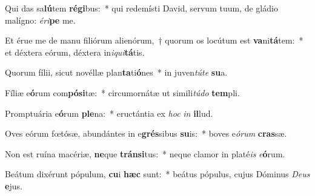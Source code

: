 \item Qui das sa\textbf{lú}tem \textbf{ré}\textbf{gi}bus:~* qui redemísti David, servum tuum, de gládio malígno: \textit{é}\textit{ri}\textbf{pe} me.
\item Et érue me de manu filiórum alienórum,~† quorum os locútum est \textbf{va}ni\textbf{tá}tem:~* et déxtera eórum, déxtera in\textit{i}\textit{qui}\textbf{tá}tis.
\item Quorum fílii, sicut novéllæ plan\textbf{ta}ti\textbf{ó}nes~* in juven\textit{tú}\textit{te} \textbf{su}a.
\item Fíliæ e\textbf{ó}rum com\textbf{pó}\textbf{si}tæ:~* circumornátæ ut simili\textit{tú}\textit{do} \textbf{tem}pli.
\item Promptuária e\textbf{ó}rum \textbf{ple}na:~* eructántia ex \textit{hoc} \textit{in} \textbf{il}lud.
\item Oves eórum fœtósæ, abundántes in e\textbf{grés}sibus \textbf{su}is:~* boves e\textit{ó}\textit{rum} \textbf{cras}sæ.
\item Non est ruína macériæ, \textbf{ne}que \textbf{tráns}\textbf{i}tus:~* neque clamor in platé\textit{is} \textit{e}\textbf{ó}rum.
\item Beátum dixérunt pópulum, \textbf{cu}i \textbf{hæc} sunt:~* beátus pópulus, cujus Dóminus \textit{De}\textit{us} \textbf{e}jus.
